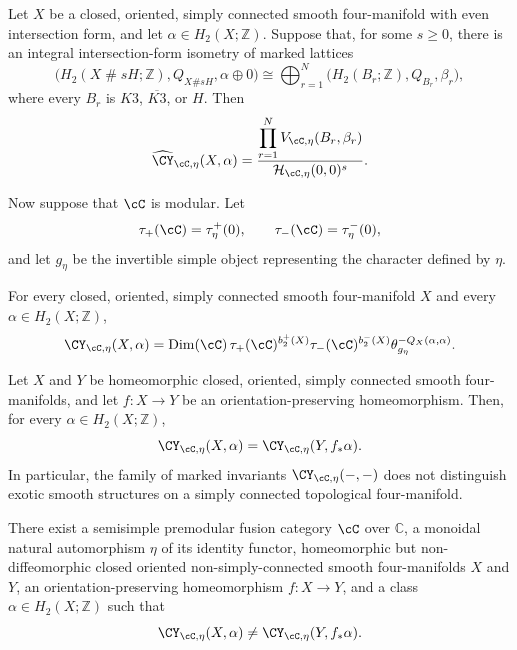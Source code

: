 \par\medskip

\begin{proposition}\label{prop:even-formula}
Let $X$ be a closed, oriented, simply connected smooth four-manifold with even
intersection form, and let $\alpha\in H_2(X;\mathbb Z)$.  Suppose that, for
some $s\geq0$, there is an integral intersection-form isometry of marked
lattices
\[
  \bigl(H_2(X\mathbin{\#}sH;\mathbb Z),Q_{X\#sH},\alpha\oplus0\bigr)
  \cong
  \bigoplus_{r=1}^{N}
    \bigl(H_2(B_r;\mathbb Z),Q_{B_r},\beta_r\bigr),
\]
where every $B_r$ is $K3$, $\overline{K3}$, or $H$.  Then
\[
  \widehat{\CY}_{\cC,\eta}(X,\alpha)
  =\frac{\displaystyle\prod_{r=1}^{N}
      V_{\cC,\eta}(B_r,\beta_r)}
    {\mathcal H_{\cC,\eta}(0,0)^s}.
\]
\end{proposition}

Now suppose that $\cC$ is modular.  Let
\[
  \tau_+(\cC)=\tau_\eta^+(0),
  \qquad
  \tau_-(\cC)=\tau_\eta^-(0),
\]
and let $g_\eta$ be the invertible simple object representing the character
defined by $\eta$.

\begin{proposition}\label{prop:modular-formula}
For every closed, oriented, simply connected smooth four-manifold $X$ and
every $\alpha\in H_2(X;\mathbb Z)$,
\[
  \CY_{\cC,\eta}(X,\alpha)
  =\operatorname{Dim}(\cC)\,
    \tau_+(\cC)^{b_2^+(X)}
    \tau_-(\cC)^{b_2^-(X)}
    \theta_{g_\eta}^{-Q_X(\alpha,\alpha)}.
\]
\end{proposition}

\begin{corollary}
\label{cor:no-simply-connected-exotic-detection}
Let $X$ and $Y$ be homeomorphic closed, oriented, simply connected smooth
four-manifolds, and let $f\colon X\to Y$ be an orientation-preserving
homeomorphism.  Then, for every $\alpha\in H_2(X;\mathbb Z)$,
\[
  \CY_{\cC,\eta}(X,\alpha)
  =\CY_{\cC,\eta}(Y,f_*\alpha).
\]
In particular, the family of marked invariants
$\CY_{\cC,\eta}(-,-)$ does not distinguish exotic smooth structures on a
simply connected topological four-manifold.
\end{corollary}

\begin{conjecture}
\label{conj:non-simply-connected-detection}
There exist a semisimple premodular fusion category $\cC$ over $\mathbb C$, a
monoidal natural automorphism $\eta$ of its identity functor, homeomorphic but
non-diffeomorphic closed oriented non-simply-connected smooth four-manifolds
$X$ and $Y$, an orientation-preserving homeomorphism $f\colon X\to Y$, and a
class $\alpha\in H_2(X;\mathbb Z)$ such that
\[
  \CY_{\cC,\eta}(X,\alpha)
  \ne\CY_{\cC,\eta}(Y,f_*\alpha).
\]
\end{conjecture}
